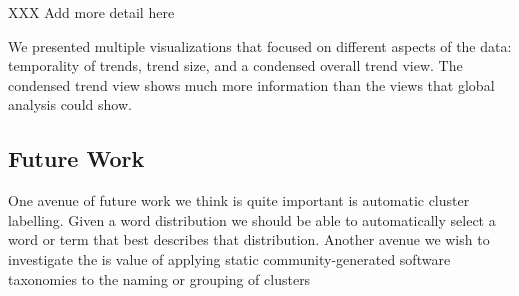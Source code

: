\documentclass[times, 10pt,twocolumn]{article}
\begin{document}
XXX Add more detail here

We presented multiple visualizations that focused on different
aspects of the data: temporality of trends, trend size, and a
condensed overall trend view. The condensed trend view shows much more
information than the views that global analysis could show.


\subsection{ Future Work}

One avenue of future work we think is quite important is automatic
cluster labelling. Given a word distribution we should be able to
automatically select a word or term that best describes that distribution.
Another avenue we wish to investigate the is value of applying
static community-generated software taxonomies to the naming or
grouping of clusters







%


\end{document}
